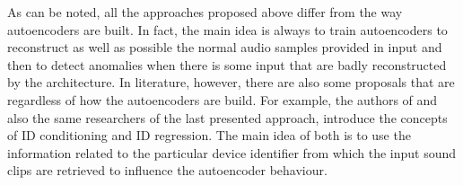 As can be noted, all the approaches proposed above differ from the way autoencoders are built. In fact, the main idea is always to train autoencoders to reconstruct as well as possible the normal audio samples provided in input and then to detect anomalies when there is some input that are badly reconstructed by the architecture. In literature, however, there are also some proposals that are regardless of how the autoencoders are build. For example, the authors of \cite{18IDConditionedAutoEncoder}\cite{19DescriptionDiscussionDCASE2020} and also the same researchers of the last presented approach, introduce the concepts of ID conditioning and ID regression. The main idea of both is to use the information related to the particular device identifier from which the input sound clips are retrieved to influence the autoencoder behaviour. 